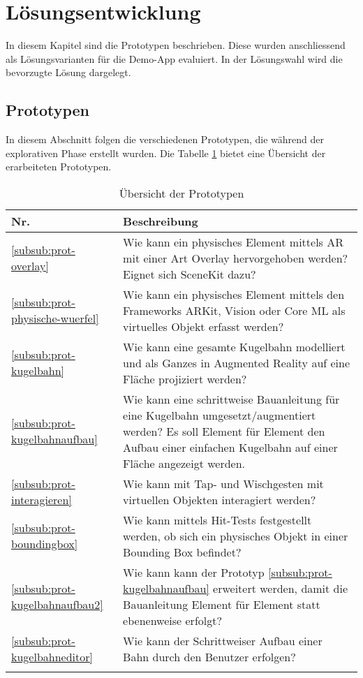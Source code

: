 \section{Lösungsentwicklung}

In diesem Kapitel sind die Prototypen beschrieben. Diese wurden anschliessend als Lösungsvarianten für die Demo-App evaluiert. In der Lösungswahl wird die bevorzugte Lösung dargelegt.

\subsection{Prototypen}

In diesem Abschnitt folgen die verschiedenen Prototypen, die während der explorativen Phase erstellt wurden. Die Tabelle \ref{tab:prototypen} bietet eine Übersicht der erarbeiteten Prototypen.
\begin{longtable}{l p{14cm}}
	\hline
	\textbf{Nr.} & \textbf{Beschreibung} \\
	\hline
  \ref{subsub:prot-overlay} & Wie kann ein physisches Element mittels AR mit einer Art Overlay hervorgehoben werden? Eignet sich SceneKit dazu? \\
  \hline
  \ref{subsub:prot-physische-wuerfel} & Wie kann ein physisches Element mittels den Frameworks ARKit, Vision oder Core ML als virtuelles Objekt erfasst werden? \\
  \hline
  \ref{subsub:prot-kugelbahn} & Wie kann eine gesamte Kugelbahn modelliert und als Ganzes in Augmented Reality auf eine Fläche projiziert werden? \\
  \hline
  \ref{subsub:prot-kugelbahnaufbau} & Wie kann eine schrittweise Bauanleitung für eine Kugelbahn umgesetzt/augmentiert werden? Es soll Element für Element den Aufbau einer einfachen Kugelbahn auf einer Fläche angezeigt werden.  \\
  \hline
  \ref{subsub:prot-interagieren} & Wie kann mit Tap- und Wischgesten mit virtuellen Objekten interagiert werden? \\
  \hline
  \ref{subsub:prot-boundingbox} & Wie kann mittels Hit-Tests festgestellt werden, ob sich ein physisches Objekt in einer Bounding Box befindet? \\
  \hline
  \ref{subsub:prot-kugelbahnaufbau2} & Wie kann kann der Prototyp \ref{subsub:prot-kugelbahnaufbau} erweitert werden, damit die Bauanleitung Element für Element statt ebenenweise erfolgt? \\
  \hline
  \ref{subsub:prot-kugelbahneditor} & Wie kann der Schrittweiser Aufbau einer Bahn durch den Benutzer erfolgen? \\
  \hline
  \caption{Übersicht der Prototypen}
  \label{tab:prototypen}
\end{longtable}

